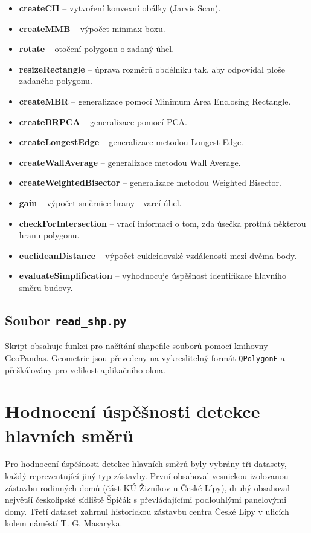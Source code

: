 \documentclass[a4paper,12pt]{article}
\begin{document}
\begin{itemize}
    \item \textbf{createCH} – vytvoření konvexní obálky (Jarvis Scan).
    \item \textbf{createMMB} – výpočet minmax boxu.
    \item \textbf{rotate} – otočení polygonu o zadaný úhel.
    \item \textbf{resizeRectangle} – úprava rozměrů obdélníku tak, aby odpovídal ploše zadaného polygonu.
    \item \textbf{createMBR} – generalizace pomocí Minimum Area Enclosing Rectangle.
    \item \textbf{createBRPCA} – generalizace pomocí PCA.
    \item \textbf{createLongestEdge} – generalizace metodou Longest Edge.
    \item \textbf{createWallAverage} – generalizace metodou Wall Average.
    \item \textbf{createWeightedBisector} – generalizace metodou Weighted Bisector.
    \item \textbf{gain} – výpočet směrnice hrany - varcí úhel.
    \item \textbf{checkForIntersection} – vrací informaci o tom, zda úsečka protíná některou hranu polygonu.
    \item \textbf{euclideanDistance} – výpočet eukleidovské vzdálenosti mezi dvěma body.
    \item \textbf{evaluateSimplification} – vyhodnocuje úspěšnost identifikace hlavního směru budovy. 
\end{itemize}

\subsection{Soubor \texttt{read\_shp.py}}
Skript obsahuje funkci pro načítání shapefile souborů pomocí knihovny GeoPandas. Geometrie jsou převedeny na vykreslitelný formát \texttt{QPolygonF} a přeškálovány pro velikost aplikačního okna.

\section{Hodnocení úspěšnosti detekce hlavních směrů}

Pro hodnocení úspěšnosti detekce hlavních směrů byly vybrány tři datasety, každý reprezentující jiný typ zástavby. První obsahoval vesnickou izolovanou zástavbu rodinných domů (část KÚ Žizníkov u České Lípy), druhý obsahoval největší českolipské sídliště Špičák s převládajícími podlouhlými panelovými domy. Třetí dataset zahrnul historickou zástavbu centra České Lípy v ulicích kolem náměstí T. G. Masaryka.
\end{document}
